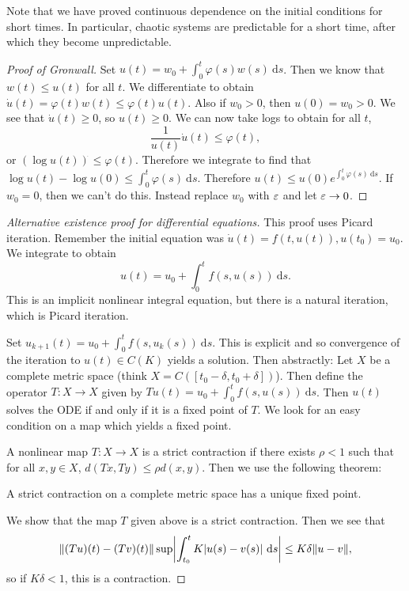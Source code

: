 \documentclass[10pt, twoside]{article}
\renewcommand{\d}{\ \mathrm{d}}
\begin{document}
    Note that we have proved continuous dependence on the initial conditions
    for short times. In particular, chaotic systems are predictable for a short
    time, after which they become unpredictable.

    \begin{proof}[Proof of Gronwall] Set $u(t) = w_0 + \int_0^t \varphi(s)w(s)
        \d s$. Then we know that $w(t) \leq u(t)$ for all $t$. We differentiate
        to obtain $\dot{u}(t) = \varphi(t)w(t) \leq \varphi(t)u(t)$. Also if
        $w_0 > 0$, then $u(0) = w_0 > 0$. We see that $\dot{u}(t) \geq 0$, so
        $u(t) \geq 0$. We can now take logs to obtain for all $t$,
        \[\frac{1}{u(t)} \dot{u}(t) \leq \varphi(t), \] or $(\log
        u(t))^{\dot{}} \leq \varphi(t)$. Therefore we integrate to find that
        $\log u(t) - \log u(0) \leq \int_0^t \varphi(s) \d s$. Therefore $u(t)
        \leq u(0)e^{\int_0^t \varphi(s) \d s}$. If $w_0 = 0$, then we can't do
        this. Instead replace $w_0$ with $\varepsilon$ and let $\varepsilon \to 0$.
    \end{proof}

    \begin{proof}[Alternative existence proof for differential equations] This
        proof uses Picard iteration. Remember the initial equation was
        $\dot{u}(t) = f(t,u(t)), u(t_0) = u_0$. We integrate to obtain \[u(t) =
        u_0 + \int_0^t f(s, u(s)) \d s.\] This is an implicit nonlinear
        integral equation, but there is a natural iteration, which is Picard
        iteration.

        Set $u_{k+1}(t) = u_0 + \int_0^t f(s,u_k(s)) \d s$. This is explicit
        and so convergence of the iteration to $u(t) \in C(K)$ yields a
        solution. Then abstractly: Let $X$ be a complete metric space (think $X
        = C([t_0-\delta, t_0+\delta])$). Then define the operator $T:X \to X$
        given by $Tu(t) = u_0 + \int_0^t f(s,u(s)) \d s$. Then $u(t)$ solves
        the ODE if and only if it is a fixed point of $T$. We look for an easy
        condition on a map which yields a fixed point.

        \begin{defn} A nonlinear map $T:X \to X$ is a
        strict contraction if there exists $\rho < 1$ such that for all $x,y
    \in X$, $d(Tx,Ty) \leq \rho d(x,y)$. Then we use the following theorem:
\end{defn}

        \begin{thm} A strict contraction on a
        complete metric space has a unique fixed point.  \end{thm}

        We show that the map $T$ given above is a strict contraction. Then we
        see that \[\norm{(Tu)(t) - (Tv)(t)} \sup \abs*{\int_{t_0}^t K \abs{u(s)
        - v(s)} \d s} \leq K \delta \norm{u-v}, \] so if $K \delta < 1$, this
    is a contraction.  \end{proof}
\end{document}
